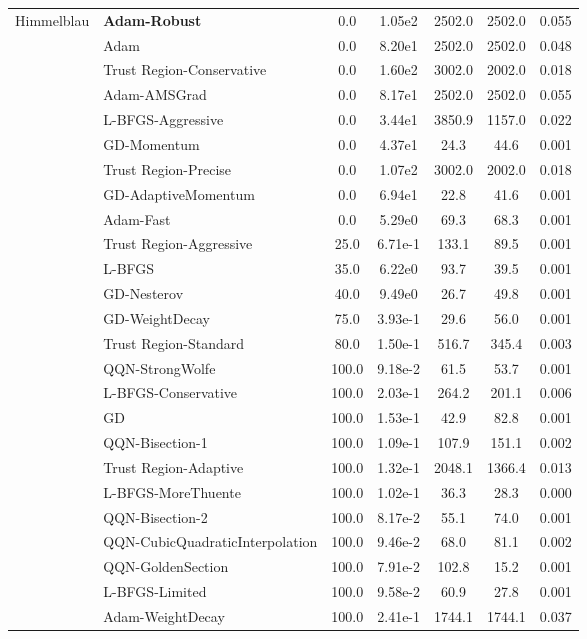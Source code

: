 \documentclass{article}
\begin{document}
\begin{table}[htbp]
{\begin{tabular}{p{2.5cm}p{2.5cm}*{5}{c}}
\midrule
\multirow{25}{*}{Himmelblau} & \textbf{Adam-Robust} & 0.0 & 1.05e2 & 2502.0 & 2502.0 & 0.055 \\
 & Adam & 0.0 & 8.20e1 & 2502.0 & 2502.0 & 0.048 \\
 & Trust Region-Conservative & 0.0 & 1.60e2 & 3002.0 & 2002.0 & 0.018 \\
 & Adam-AMSGrad & 0.0 & 8.17e1 & 2502.0 & 2502.0 & 0.055 \\
 & L-BFGS-Aggressive & 0.0 & 3.44e1 & 3850.9 & 1157.0 & 0.022 \\
 & GD-Momentum & 0.0 & 4.37e1 & 24.3 & 44.6 & 0.001 \\
 & Trust Region-Precise & 0.0 & 1.07e2 & 3002.0 & 2002.0 & 0.018 \\
 & GD-AdaptiveMomentum & 0.0 & 6.94e1 & 22.8 & 41.6 & 0.001 \\
 & Adam-Fast & 0.0 & 5.29e0 & 69.3 & 68.3 & 0.001 \\
 & Trust Region-Aggressive & 25.0 & 6.71e-1 & 133.1 & 89.5 & 0.001 \\
 & L-BFGS & 35.0 & 6.22e0 & 93.7 & 39.5 & 0.001 \\
 & GD-Nesterov & 40.0 & 9.49e0 & 26.7 & 49.8 & 0.001 \\
 & GD-WeightDecay & 75.0 & 3.93e-1 & 29.6 & 56.0 & 0.001 \\
 & Trust Region-Standard & 80.0 & 1.50e-1 & 516.7 & 345.4 & 0.003 \\
 & QQN-StrongWolfe & 100.0 & 9.18e-2 & 61.5 & 53.7 & 0.001 \\
 & L-BFGS-Conservative & 100.0 & 2.03e-1 & 264.2 & 201.1 & 0.006 \\
 & GD & 100.0 & 1.53e-1 & 42.9 & 82.8 & 0.001 \\
 & QQN-Bisection-1 & 100.0 & 1.09e-1 & 107.9 & 151.1 & 0.002 \\
 & Trust Region-Adaptive & 100.0 & 1.32e-1 & 2048.1 & 1366.4 & 0.013 \\
 & L-BFGS-MoreThuente & 100.0 & 1.02e-1 & 36.3 & 28.3 & 0.000 \\
 & QQN-Bisection-2 & 100.0 & 8.17e-2 & 55.1 & 74.0 & 0.001 \\
 & QQN-CubicQuadraticInterpolation & 100.0 & 9.46e-2 & 68.0 & 81.1 & 0.002 \\
 & QQN-GoldenSection & 100.0 & 7.91e-2 & 102.8 & 15.2 & 0.001 \\
 & L-BFGS-Limited & 100.0 & 9.58e-2 & 60.9 & 27.8 & 0.001 \\
 & Adam-WeightDecay & 100.0 & 2.41e-1 & 1744.1 & 1744.1 & 0.037 \\

\end{tabular}}
\end{table}
\end{document}
